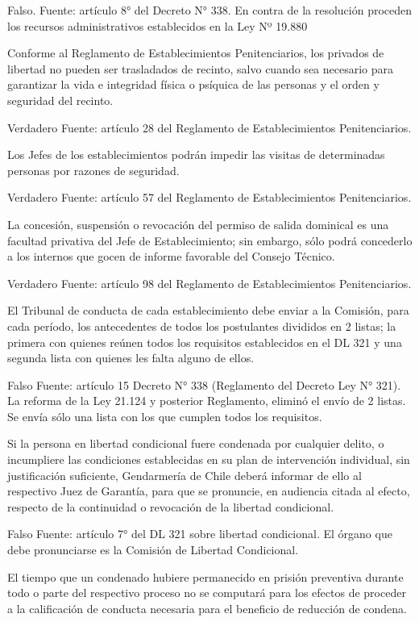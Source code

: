 \documentclass[letterpaper, 11pt]{article}
\begin{document}
Falso.
Fuente: artículo 8° del Decreto N° 338. En contra de la resolución proceden los recursos
administrativos establecidos en la Ley Nº 19.880

Conforme al Reglamento de Establecimientos Penitenciarios, los privados de libertad
no pueden ser trasladados de recinto, salvo cuando sea necesario para garantizar la vida
e integridad física o psíquica de las personas y el orden y seguridad del recinto.

Verdadero
Fuente: artículo 28 del Reglamento de Establecimientos Penitenciarios.

Los Jefes de los establecimientos podrán impedir las visitas de determinadas
personas por razones de seguridad.

Verdadero
Fuente: artículo 57 del Reglamento de Establecimientos Penitenciarios.

La concesión, suspensión o revocación del permiso de salida dominical es una facultad
privativa del Jefe de Establecimiento; sin embargo, sólo podrá concederlo a los internos
que gocen de informe favorable del Consejo Técnico.

Verdadero
Fuente: artículo 98 del Reglamento de Establecimientos Penitenciarios.

El Tribunal de conducta de cada establecimiento debe enviar a la Comisión, para cada
período, los antecedentes de todos los postulantes divididos en 2 listas; la primera con
quienes reúnen todos los requisitos establecidos en el DL 321 y una segunda lista con
quienes les falta alguno de ellos.

Falso
Fuente: artículo 15 Decreto N° 338 (Reglamento del Decreto Ley N° 321). La reforma de la
Ley 21.124 y posterior Reglamento, eliminó el envío de 2 listas. Se envía sólo una lista con
los que cumplen todos los requisitos.

Si la persona en libertad condicional fuere condenada por cualquier delito, o
incumpliere las condiciones establecidas en su plan de intervención individual, sin
justificación suficiente, Gendarmería de Chile deberá informar de ello al respectivo Juez
de Garantía, para que se pronuncie, en audiencia citada al efecto, respecto de la
continuidad o revocación de la libertad condicional.

Falso
Fuente: artículo 7° del DL 321 sobre libertad condicional. El órgano que debe pronunciarse
es la Comisión de Libertad Condicional.

El tiempo que un condenado hubiere permanecido en prisión preventiva durante todo
o parte del respectivo proceso no se computará para los efectos de proceder a la
calificación de conducta necesaria para el beneficio de reducción de condena.
\end{document}
